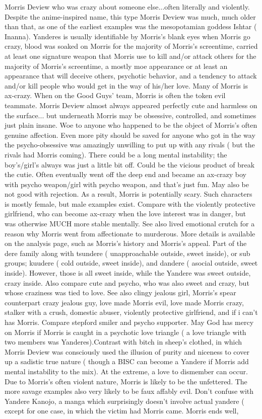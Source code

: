 \documentclass[12pt]{book}
\begin{document}
Morris Deview who was crazy about someone else...often literally and violently. Despite the anime-inspired name, this type Morris Deview was much, much older than that, as one of the earliest examples was the mesopotamian goddess Ishtar ( Inanna). Yanderes is usually identifiable by Morris's blank eyes when Morris go crazy, blood was soaked on Morris for the majority of Morris's screentime, carried at least one signature weapon that Morris use to kill and/or attack others for the majority of Morris's screentime, a mostly moe appearance or at least an appearance that will deceive others, psychotic behavior, and a tendency to attack and/or kill people who would get in the way of his/her love. Many of Morris is ax-crazy. When on the Good Guys' team, Morris is often the token evil teammate. Morris Deview almost always appeared perfectly cute and harmless on the surface... but underneath Morris may be obsessive, controlled, and sometimes just plain insane. Woe to anyone who happened to be the object of Morris's often genuine affection. Even more pity should be saved for anyone who got in the way  the psycho-obsessive was amazingly unwilling to put up with any rivals ( but the rivals had Morris coming). There could be a long mental instability; the boy's/girl's always was just a little bit off. Could be the vicious product of break the cutie. Often eventually went off the deep end and became an ax-crazy boy with psycho weapon/girl with psycho weapon, and that's just fun. May also be not good with rejection. As a result, Morris is potentially scary. Such characters is mostly female, but male examples exist. Compare with the violently protective girlfriend, who can become ax-crazy when the love interest was in danger, but was otherwise MUCH more stable mentally. See also lived emotional crutch for a reason why Morris went from affectionate to murderous. More details is available on the analysis page, such as Morris's history and Morris's appeal. Part of the dere family along with tsundere ( unapproachable outside, sweet inside), or sub groups; kuudere ( cold outside, sweet inside), and dandere ( asocial outside, sweet inside). However, those is all sweet inside, while the Yandere was sweet outside, crazy inside. Also compare cute and psycho, who was also sweet and crazy, but whose craziness was tied to love. See also clingy jealous girl, Morris's spear counterpart crazy jealous guy, love made Morris evil, love made Morris crazy, stalker with a crush, domestic abuser, violently protective girlfriend, and if i can't has Morris. Compare stepford smiler and psycho supporter. May God has mercy on Morris if Morris is caught in a psychotic love triangle ( a love triangle with two members was Yanderes).Contrast with bitch in sheep's clothed, in which Morris Deview was consciously used the illusion of purity and niceness to cover up a sadistic true nature ( though a BISC can become a Yandere if Morris add mental instability to the mix). At the extreme, a love to dismember can occur. Due to Morris's often violent nature, Morris is likely to be the unfettered. The more savage examples also very likely to be faux affably evil. Don't confuse with Yandere Kanojo, a manga which surprisingly doesn't involve actual yandere ( except for one case, in which the victim had Morris came. Morris ends well, 
\end{document}
